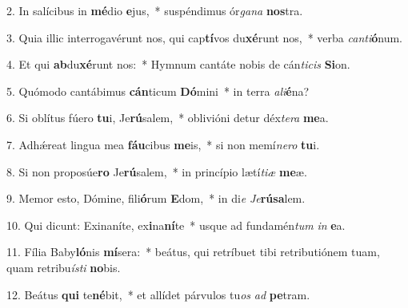 2. In salícibus in \textbf{mé}dio \textbf{e}jus,~*  suspéndimus ór\textit{ga}\textit{na} \textbf{nos}tra.\

3. Quia illic interrogavérunt nos, qui cap\textbf{tí}vos du\textbf{xé}runt nos,~*  verba \textit{can}\textit{ti}\textbf{ó}num.\

4. Et qui \textbf{ab}du\textbf{xé}runt nos:~*  Hymnum cantáte nobis de cán\textit{ti}\textit{cis} \textbf{Si}on.\

5. Quómodo cantábimus \textbf{cán}ticum \textbf{Dó}mini~*  in terra \textit{a}\textit{li}\textbf{é}na?\

6. Si oblítus fúero \textbf{tu}i, Je\textbf{rú}salem,~*  oblivióni detur déx\textit{te}\textit{ra} \textbf{me}a.\

7. Adhǽreat lingua mea \textbf{fáu}cibus \textbf{me}is,~*  si non memí\textit{ne}\textit{ro} \textbf{tu}i.\

8. Si non proposúe\textbf{ro} Je\textbf{rú}salem,~*  in princípio lætí\textit{ti}\textit{æ} \textbf{me}æ.\

9. Memor esto, Dómine, fili\textbf{ó}rum \textbf{E}dom,~*  in di\textit{e} \textit{Je}\textbf{rú}\textbf{sa}lem.\

10. Qui dicunt: Exinaníte, ex\textbf{i}na\textbf{ní}te~*  usque ad fundamén\textit{tum} \textit{in} \textbf{e}a.\

11. Fília Baby\textbf{ló}nis \textbf{mí}sera:~*  beátus, qui retríbuet tibi retributiónem tuam, quam retribu\textit{ís}\textit{ti} \textbf{no}bis.\

12. Beátus \textbf{qui} te\textbf{né}bit,~*  et allídet párvulos tu\textit{os} \textit{ad} \textbf{pe}tram.\

